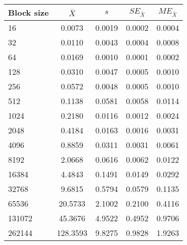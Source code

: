 \begin{tabular}{lcccc}\toprule
{\small Block size} & $\bar{X}$ & $s$ & $SE_{\bar{X}}$ & $ME_{\bar{X}}$ \\\midrule
16 & 0.0073 & 0.0019 & 0.0002 & 0.0004\\
32 & 0.0110 & 0.0043 & 0.0004 & 0.0008\\
64 & 0.0169 & 0.0010 & 0.0001 & 0.0002\\
128 & 0.0310 & 0.0047 & 0.0005 & 0.0010\\
256 & 0.0572 & 0.0048 & 0.0005 & 0.0010\\
512 & 0.1138 & 0.0581 & 0.0058 & 0.0114\\
1024 & 0.2180 & 0.0116 & 0.0012 & 0.0024\\
2048 & 0.4184 & 0.0163 & 0.0016 & 0.0031\\
4096 & 0.8859 & 0.0311 & 0.0031 & 0.0061\\
8192 & 2.0668 & 0.0616 & 0.0062 & 0.0122\\
16384 & 4.4843 & 0.1491 & 0.0149 & 0.0292\\
32768 & 9.6815 & 0.5794 & 0.0579 & 0.1135\\
65536 & 20.5733 & 2.1002 & 0.2100 & 0.4116\\
131072 & 45.3676 & 4.9522 & 0.4952 & 0.9706\\
262144 & 128.3593 & 9.8275 & 0.9828 & 1.9263\\
\bottomrule
\end{tabular}
